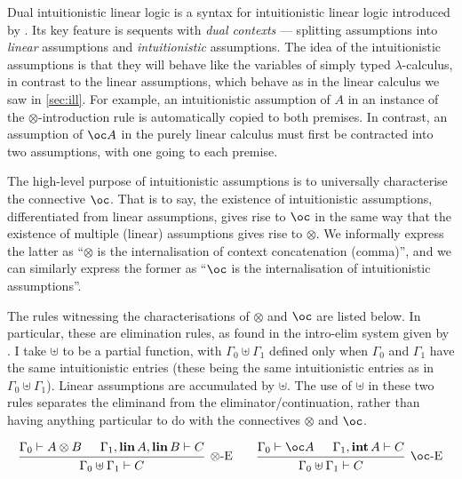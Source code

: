 Dual intuitionistic linear logic is a syntax for intuitionistic linear logic
introduced by \citet{Barber1996}.
Its key feature is sequents with \emph{dual contexts} --- splitting assumptions
into \emph{linear} assumptions and \emph{intuitionistic} assumptions.
The idea of the intuitionistic assumptions is that they will behave like the
variables of simply typed $\lambda$-calculus, in contrast to the linear
assumptions, which behave as in the linear calculus we saw in \autoref{sec:ill}.
For example, an intuitionistic assumption of $A$ in an instance of the
$\otimes$-introduction rule is automatically copied to both premises.
In contrast, an assumption of $\oc A$ in the purely linear calculus must first
be contracted into two assumptions, with one going to each premise.

The high-level purpose of intuitionistic assumptions is to universally
characterise the connective $\oc$.
That is to say, the existence of intuitionistic assumptions, differentiated from
linear assumptions, gives rise to $\oc$ in the same way that the existence of
multiple (linear) assumptions gives rise to $\otimes$.
We informally express the latter as ``$\otimes$ is the internalisation of
context concatenation (comma)'', and we can similarly express the former as
``$\oc$ is the internalisation of intuitionistic assumptions''.

The rules witnessing the characterisations of $\otimes$ and $\oc$ are listed
below.
In particular, these are elimination rules, as found in the intro-elim system
given by \citeauthor{Barber1996}.
I take $\uplus$ to be a partial function, with $\Gamma_0 \uplus \Gamma_1$
defined only when $\Gamma_0$ and $\Gamma_1$ have the same intuitionistic
entries (these being the same intuitionistic entries as in
$\Gamma_0 \uplus \Gamma_1$).
Linear assumptions are accumulated by $\uplus$.
The use of $\uplus$ in these two rules separates the eliminand from the
eliminator/continuation, rather than having anything particular to do with
the connectives $\otimes$ and $\oc$.

\[
  \begin{matrix}
    \begin{prooftree}
      \hypo{\Gamma_0 \vdash A \otimes B}
      \hypo{\Gamma_1, \mathbf{lin}\,A, \mathbf{lin}\,B \vdash C}
      \infer2[$\otimes$-E]{\Gamma_0 \uplus \Gamma_1 \vdash C}
    \end{prooftree}
    &&
    \begin{prooftree}
      \hypo{\Gamma_0 \vdash \oc A}
      \hypo{\Gamma_1, \mathbf{int}\,A \vdash C}
      \infer2[$\oc$-E]{\Gamma_0 \uplus \Gamma_1 \vdash C}
    \end{prooftree}
  \end{matrix}
\]

